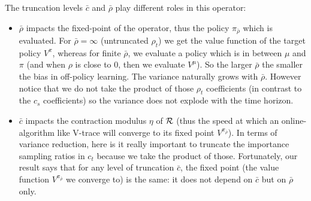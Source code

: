 \begin{remark} The truncation levels $\bar c$ and $\bar \rho$ play different roles in this operator:
\begin{itemize}
 \item $\bar \rho$ impacts the fixed-point of the operator, thus the policy $\pi_{\bar \rho}$ which is evaluated. For $\bar \rho=\infty$ (untruncated $\rho_t$) we get the value function of the target policy $V^{\pi}$, whereas for finite $\bar \rho$, we evaluate a policy which is in between $\mu$ and $\pi$ (and when $\rho$ is close to $0$, then we evaluate $V^{\mu}$). So the larger $\bar \rho$ the smaller the bias in off-policy learning. The variance naturally grows with $\bar \rho$. However notice that we do not take the product of those $\rho_t$ coefficients (in contrast to the $c_s$ coefficients) so the variance does not explode with the time horizon.
 \item $\bar c$ impacts the contraction modulus $\eta$ of ${\cal R}$ (thus the speed at which an online-algorithm like V-trace will converge to its fixed point $V^{\pi_{\bar \rho}}$). In terms of variance reduction, here is it really important to truncate the importance sampling ratios in $c_t$ because we take the product of those. Fortunately, our result says that for any level of truncation $\bar c$, the fixed point (the value function $V^{\pi_{\bar \rho}}$ we converge to) is the same: it does not depend on $\bar c$ but on $\bar \rho$ only.
\end{itemize}
\end{remark}

